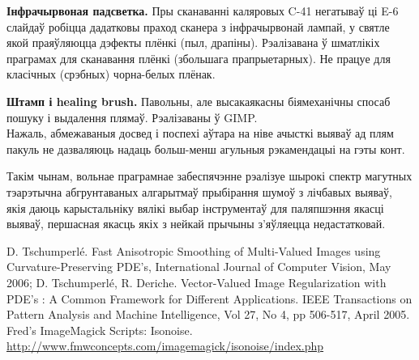 \documentclass[10pt, a5paper]{article}
\def\fakeparagraph#1{\textbf{#1}}
\begin{document}
\fakeparagraph{Інфрачырвоная падсветка.}
Пры сканаванні каляровых C-41 негатываў ці E-6 слайдаў робіцца дадатковы праход сканера з інфрачырвонай лампай, у святле якой праяўляюцца дэфекты плёнкі (пыл, драпіны). Рэалізавана ў шматлікіх праграмах для сканавання плёнкі (збольшага прапрыетарных). Не працуе для класічных (срэбных) чорна-белых плёнак.

\fakeparagraph{Штамп і healing brush.}
Павольны, але высакаякасны біямеханічны спосаб пошуку і выдалення плямаў. Рэалізаваны ў {GIMP}.\\

Нажаль, абмежаваныя досвед і поспехі аўтара на ніве ачысткі выяваў ад плям пакуль не дазваляюць надаць больш-менш агульныя рэкамендацыі на гэты конт.

Такім чынам, вольнае праграмнае забеспячэнне рэалізуе шырокі спектр магутных тэарэтычна абгрунтаваных алгарытмаў прыбірання шумоў з лічбавых выяваў, якія даюць карыстальніку вялікі выбар інструментаў для паляпшэння якасці выяваў, першасная якасць якіх з нейкай прычыны з’яўляецца недастатковай.

\begin{thebibliography}{9}
 D. Tschumperlé. Fast Anisotropic Smoothing of Multi-Valued Images using Curvature-Preserving PDE's, International Journal of Computer Vision, May 2006;
 D. Tschumperlé, R. Deriche. Vector-Valued Image Regularization with PDE's : A Common Framework for Different Applications. IEEE Transactions on Pattern Analysis and Machine Intelligence, Vol 27, No 4, pp 506-517, April 2005.
 Fred's ImageMagick Scripts: Isonoise. \url{http://www.fmwconcepts.com/imagemagick/isonoise/index.php}
\end{thebibliography}
\end{document}

